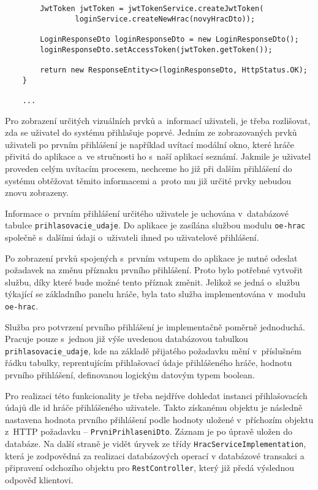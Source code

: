 \documentclass[twoside, 12pt]{article}
\begin{document}
{\begin{lstlisting}
        JwtToken jwtToken = jwtTokenService.createJwtToken(
                loginService.createNewHrac(novyHracDto));

        LoginResponseDto loginResponseDto = new LoginResponseDto();
        loginResponseDto.setAccessToken(jwtToken.getToken());

        return new ResponseEntity<>(loginResponseDto, HttpStatus.OK);
    }

    ...

\end{lstlisting}

\clearpage



Pro zobrazení určitých vizuálních prvků a~informací uživateli, je třeba rozlišovat,
zda se uživatel do systému přihlašuje poprvé. Jedním ze zobrazovaných prvků uživateli po prvním přihlášení je například uvítací modální okno,
které hráče přivitá do aplikace a~ve stručnosti ho s~naší aplikací seznámí.
Jakmile je uživatel proveden celým uvítacím procesem, nechceme ho již při dalším přihlášení do systému
obtěžovat těmito informacemi a~proto mu již určité prvky nebudou znovu zobrazeny.

Informace o~prvním přihlášení určitého uživatele je uchována v~databázové tabulce \texttt{prihlasovacie\_udaje}.
Do aplikace je zasílána službou modulu \texttt{oe-hrac} společně s~dalšími údaji o~uživateli ihned po uživatelově přihlášení.

Po zobrazení prvků spojených s~prvním vstupem do aplikace je nutné odeslat požadavek na změnu příznaku prvního přihlášení.
Proto bylo potřebné vytvořit službu, díky které bude možné tento příznak změnit.
Jelikož se jedná o~službu týkající se základního panelu hráče, byla tato služba implementována v~modulu \texttt{oe-hrac}.

Služba pro potvrzení prvního přihlášení je implementačně poměrně jednoduchá.
Pracuje pouze s~jednou již výše uvedenou databázovou tabulkou \texttt{prihlasovacie\_udaje},
kde na základě přijatého požadavku mění v~příslušném řádku tabulky,
reprentujícím přihlašovací údaje přihlášeného hráče, hodnotu prvního přihlášení,
definovanou logickým datovým typem boolean.

Pro realizaci této funkcionality je třeba nejdříve dohledat instanci přihlašovacích údajů dle id hráče přihlášeného uživatele.
Takto získanému objektu je následně nastavena hodnota prvního přihlášení
podle hodnoty uložené v~příchozím objektu z~HTTP požadavku -- \texttt{PrvniPrihlaseniDto}.
Záznam je po úpravě uložen do databáze.
Na další straně je vidět úryvek ze třídy \texttt{HracServiceImplementation},
která je zodpovědná za realizaci databázových operací v databázové transakci
a připravení odchozího objektu pro \texttt{RestController},
který již předá výslednou odpověď klientovi.

}
\end{document}
